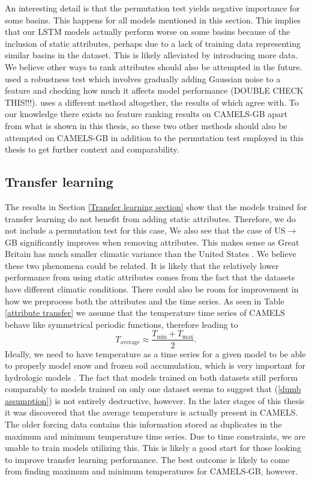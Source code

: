 An interesting detail is that the permutation test yields negative importance 
for some basins. This happens for all models mentioned in this section. 
This implies that our LSTM models actually perform worse 
on some basins because of the inclusion of static attributes, perhaps due to a 
lack of training data representing similar basins in the dataset. This is likely 
alleviated by introducing more data. We believe other ways to rank attributes 
should also be attempted 
in the future. \citet{lstm_second_paper} used a robustness test which 
involves gradually adding Gaussian noise to a feature and checking how much it 
affects model performance (DOUBLE CHECK THIS!!!). \citet{OrigCAMELSRanking} 
uses a different method altogether, the results of which \cite{lstm_second_paper} 
agree with. To our knowledge there exists no feature ranking results on CAMELS-GB 
apart from what is shown in this thesis, 
so these two other methods should also be attempted on CAMELS-GB in addition 
to the permutation test employed in this thesis to get further context and comparability.

\subsection{Transfer learning}
The results in Section \ref{Transfer learning section} show that the models trained 
for transfer learning do not benefit from adding static attributes. Therefore, we 
do not include a permutation test for this case, We also see 
that the case of US$\rightarrow$GB significantly improves when removing attributes. This makes 
sense as Great Britain has much smaller climatic variance than the United States 
\citationneeded. We believe these two phenomena could be related. It is likely 
that the relatively lower performance from using static attributes comes from the 
fact that the datasets have different climatic conditions. There could also be 
room for improvement in how we preprocess both the attributes and the time series. 
As seen in Table \ref{attribute transfer} we assume that the temperature time series 
of CAMELS behave like symmetrical periodic functions, therefore leading to 
\begin{equation}
T_\text{average} \approx  \frac{T_\text{min}+T_\text{max}}{2}. \label{dumb assumption}
\end{equation}
Ideally, we need to have temperature as a time series for a given model to be able 
to properly model snow and frozen soil accumulation, which is very important for 
hydrologic models \citationneeded. The fact that models trained on both datasets 
still perform comparably to models trained on only one dataset seems to suggest 
that (\ref{dumb assumption}) is not entirely destructive, however.
In the later stages of this thesis it was discovered that the average temperature 
is actually present in CAMELS. The older forcing data \citationneeded contains 
this information stored as duplicates in the maximum and minimum temperature time 
series. Due to time constraints, we are unable to train models utilizing this. 
This is likely a good start for those looking to improve transfer learning performance. 
The best outcome is likely to come from finding maximum and minimum temperatures 
for CAMELS-GB, however.


